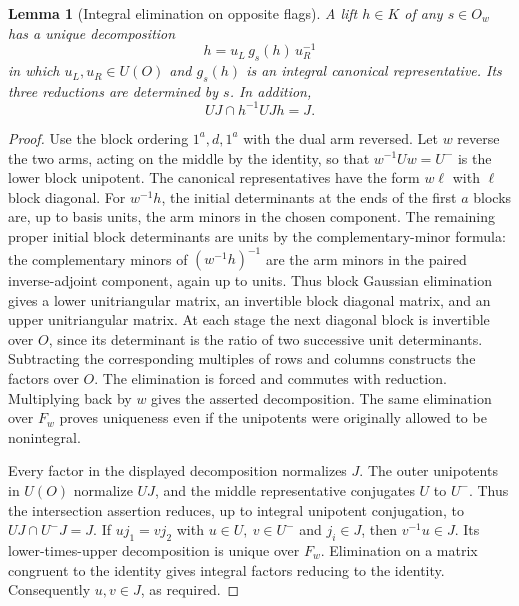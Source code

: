 \documentclass[a4paper,11pt]{article}
\newtheorem{lemma}[proposition]{Lemma}
\theoremstyle{definition}
\theoremstyle{remark}
\numberwithin{equation}{section}
\begin{document}
\begin{lemma}[Integral elimination on opposite flags]
\leavevmode\label{lem:oppositecosets885}
A lift \(h\in K\) of any \(s\in O_w\) has a unique decomposition
\[
             h=u_L\,g_s(h)\,u_R^{-1}
\]
in which \(u_L,u_R\in U(O)\) and \(g_s(h)\) is an integral canonical
representative. Its three reductions are determined by \(s\).
In addition,
\[
                        UJ\cap h^{-1}UJh=J .
\]
\end{lemma}
\begin{proof}
Use the block ordering \(1^a,d,1^a\) with the dual arm reversed.
Let \(w\) reverse the two arms, acting on the middle by the identity,
so that \(w^{-1}Uw=U^-\) is the lower block unipotent. The canonical
representatives have the form \(w\ell\) with \(\ell\) block diagonal.
For \(w^{-1}h\), the initial determinants at the ends of the first
\(a\) blocks are, up to basis units, the arm minors in the chosen
component. The remaining proper initial block determinants are
units by the complementary-minor formula: the complementary
minors of \((w^{-1}h)^{-1}\) are the arm minors in the paired
inverse-adjoint component, again up to units. Thus block Gaussian
elimination gives a lower unitriangular matrix, an invertible
block diagonal matrix, and an upper unitriangular matrix. At
each stage the next diagonal block is invertible over \(O\),
since its determinant is the ratio of two successive unit
determinants. Subtracting the corresponding multiples of rows
and columns constructs the factors over \(O\). The elimination
is forced and commutes with reduction. Multiplying back by \(w\)
gives the asserted decomposition. The same elimination over \(F_w\)
proves uniqueness even if the unipotents were originally allowed
to be nonintegral.

Every factor in the displayed decomposition normalizes \(J\).
The outer unipotents in \(U(O)\) normalize \(UJ\), and the
middle representative conjugates \(U\) to \(U^-\). Thus the
intersection assertion reduces, up to integral unipotent
conjugation, to \(UJ\cap U^-J=J\). If \(u j_1=v j_2\) with
\(u\in U,\ v\in U^-\) and \(j_i\in J\), then \(v^{-1}u\in J\).
Its lower-times-upper decomposition is unique over \(F_w\).
Elimination on a matrix congruent to the identity gives integral
factors reducing to the identity. Consequently \(u,v\in J\),
as required.
\end{proof}
\end{document}
